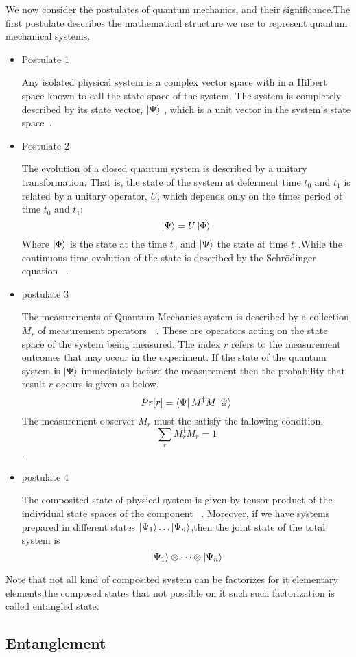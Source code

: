 We now consider the postulates of quantum mechanics, and their significance.The first postulate describes the mathematical structure we use to represent quantum mechanical systems.
\begin{itemize}
\item {Postulate 1}

Any isolated physical system is a complex vector space with in a Hilbert space known to call the state space of the system. The system is completely described by its state vector, $\ket{\Psi}$ , which is a unit vector in the system’s state space~\cite{book:17312}.
\item{Postulate 2}

The evolution of a closed quantum system is described by a unitary transformation. That is, the state of the system at deferment time $t_0$ and $t_1$ is related  by a unitary operator, $U$, which depends only on the times period of time $t_0$ and $t_1$:
$$\ket{\Psi}=U\ket{\Phi}$$
Where $\ket{\Phi}$ is the state at the time $t_0$ and $\ket{\Psi}$ the state at time $t_1$.While the continuous time evolution  of the state is described by the Schrödinger equation ~\cite{book:17312}.
\item{postulate 3}

The measurements of Quantum Mechanics system  is described by a collection ${M_r }$ of measurement operators~\citep{book:17312}~. These are operators acting on the state space of the system being
measured. The index $r $ refers to the measurement outcomes that may occur in the experiment. If the state of the quantum system is $\ket{\Psi}$ immediately before the measurement then the probability that result $r$ occurs is given as below.
$$Pr[r]=\bra{\Psi}M^{\dagger}  M\ket{\Psi}$$ 
The measurement observer ${M_r }$ must the satisfy the fallowing condition.
$$\sum_r M_{r}^{\dagger} M_r=1$$.


\item{postulate 4}

The composited state of physical system is given by  tensor product of the individual state spaces of the component~\citep{book:889079} . Moreover, if we have systems prepared  in different  states $\ket{\Psi_1} \dots \ket{\Psi_n}$,then the joint state of the total system is
$$\ket{\Psi_1}\otimes\dots \otimes\ket{\Psi_n}$$
\end{itemize}
Note that not all kind of composited system can be factorizes for it elementary elements,the composed  states that  not possible  on it such such factorization is  called entangled state.
\subsection{Entanglement}

